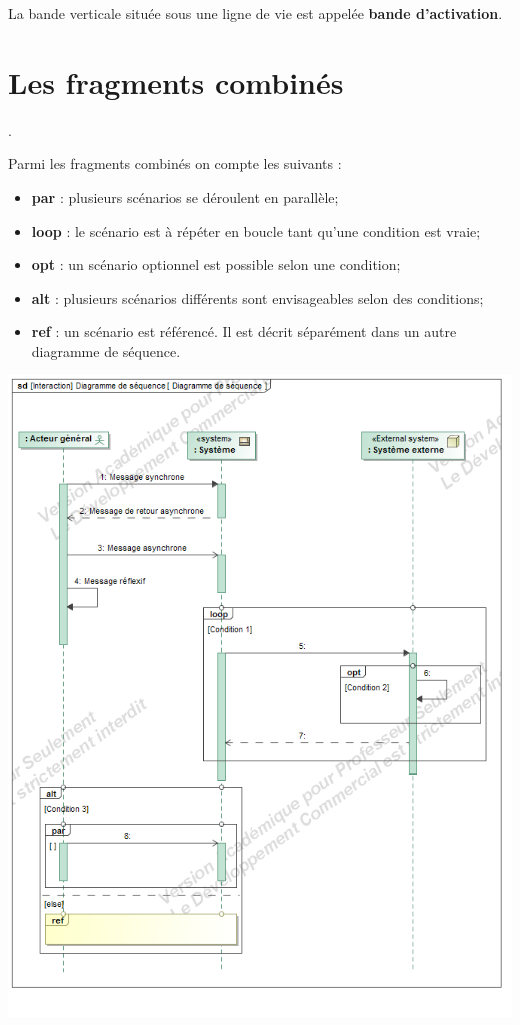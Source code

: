\documentclass[10pt]{article}
\begin{document}
\begin{rem}
La bande verticale située sous une ligne de vie est appelée \textbf{bande d'activation}.
\end{rem}
\section{Les fragments combinés}.

\begin{defi}
Parmi les fragments combinés on compte les suivants :
\begin{itemize}
\item \textbf{par} : plusieurs scénarios se déroulent en parallèle;
\item \textbf{loop} : le scénario est à répéter en boucle tant qu'une condition est vraie;
\item \textbf{opt} : un scénario optionnel est possible selon une condition;
\item \textbf{alt} : plusieurs scénarios différents sont envisageables selon des conditions;
\item \textbf{ref} : un scénario est référencé. Il est décrit séparément dans un autre diagramme de séquence. 
\end{itemize}
\end{defi}

\begin{center}
\includegraphics[width=.95\textwidth]{images/sequence}
\end{center}
\end{document}
